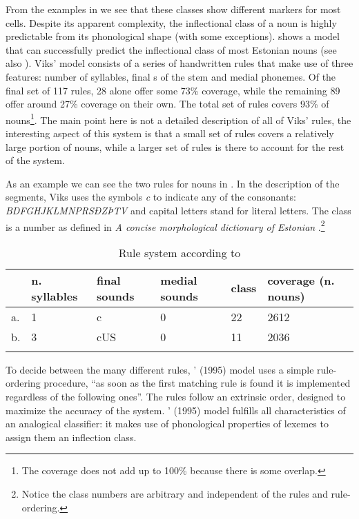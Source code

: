 From the examples in  we see that these classes show different markers for most cells. Despite its apparent complexity, the inflectional class of a noun is highly predictable from its phonological shape (with some exceptions). \textcite{Viks.1995} shows a model that can successfully predict the inflectional class of most Estonian nouns (see also \citealt{Viks.1994}). Viks' model consists of a series of handwritten rules that make use of three features: number of syllables, final s of the stem and medial phonemes. Of the final set of 117 rules, 28 alone offer some 73\% coverage, while the remaining 89 offer around 27\% coverage on their own. The total set of rules covers 93\% of nouns\footnote{The coverage does not add up to 100\% because there is some overlap.}. The main point here is not a detailed description of all of Viks' rules, the interesting aspect of this system is that a small set of rules covers a relatively large portion of nouns, while a larger set of rules is there to account for the rest of the system.

As an example we can see the two rules for nouns in . In the description of the segments, Viks uses the symbols \textit{c} to indicate any of the consonants: \textit{BDFGHJKLMNPRSÐZÞTV} and capital letters stand for literal letters. The class is a number as defined in \textit{A concise morphological dictionary of Estonian} \autocite{Viks.1992}.\footnote{Notice the class numbers are arbitrary and independent of the rules and rule-ordering.}

\begin{table}[t]
    \centering
    \caption{Rule system according to \textcite{Viks.1992}}\label{tab:exe-rules-viks}
    \begin{tabular}[t]{llllll}
      \lsptoprule
      & n. syllables & final sounds & medial sounds & class & coverage (n. nouns) \\
      \midrule
      a. & 1                   & c            & 0             & 22            & 2612          \\
      b. & 3                   & cUS          & 0             & 11            & 2036          \\
      \lspbottomrule
    \end{tabular}
\end{table}

To decide between the many different rules, \citeauthor{Viks.1995}' (1995) model uses a simple rule-ordering procedure, ``as soon as the first matching rule is found it is implemented regardless of the following ones''. The rules follow an extrinsic order, designed to maximize the accuracy of the system. \citeauthor{Viks.1995}' (1995) model fulfills all characteristics of an analogical classifier: it makes use of phonological properties of lexemes to assign them an inflection class.

